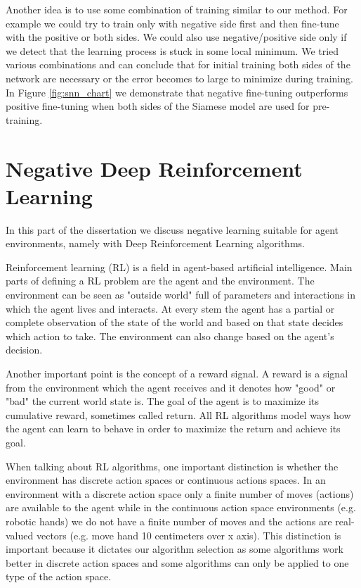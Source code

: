 \documentclass[b5paper]{book}
\let\cite\parencite
\begin{document}
Another idea is to use some combination of training similar to our method. For example we could try to train only with negative side first and then fine-tune with the positive or both sides. We could also use negative/positive side only if we detect that the learning process is stuck in some local minimum. We tried various combinations and can conclude that for initial training both sides of the network are necessary or the error becomes to large to minimize during training. In Figure \ref{fig:snn_chart} we demonstrate that negative fine-tuning outperforms positive fine-tuning when both sides of the Siamese model are used for pre-training.

\chapter{Negative Deep Reinforcement Learning}

In this part of the dissertation we discuss negative learning suitable for agent environments, namely with Deep Reinforcement Learning algorithms.

Reinforcement learning (RL) is a field in agent-based artificial intelligence. \cite{russell2002artificial} Main parts of defining a RL problem are the agent and the environment. The environment can be seen as "outside world" full of parameters and interactions in which the agent lives and interacts. At every stem the agent has a partial or complete observation of the state of the world and based on that state decides which action to take. The environment can also change based on the agent's decision.

Another important point is the concept of a reward signal. A reward is a signal from the environment which the agent receives and it denotes how "good" or "bad" the current world state is. The goal of the agent is to maximize its cumulative reward, sometimes called return. All RL algorithms model ways how the agent can learn to behave in order to maximize the return and achieve its goal.

When talking about RL algorithms, one important distinction is whether the environment has discrete action spaces or continuous actions spaces. In an environment with a discrete action space only a finite number of moves (actions) are available to the agent while in the continuous action space environments (e.g. robotic hands) we do not have a finite number of moves and the actions are real-valued vectors (e.g. move hand 10 centimeters over x axis). This distinction is important because it dictates our algorithm selection as some algorithms work better in discrete action spaces and some algorithms can only be applied to one type of the action space.
\end{document}
